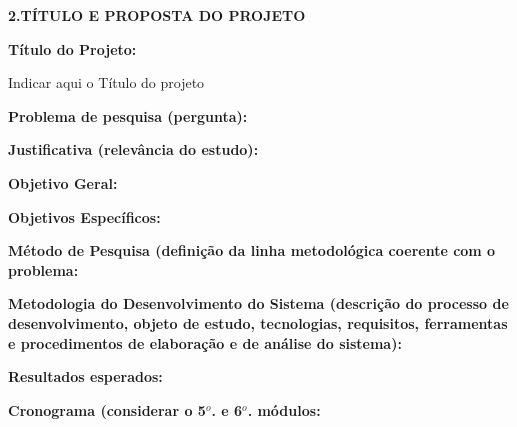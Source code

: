 \documentclass[
	hidelinks,
	12pt,				%
	openright,			%
	oneside,			%
	a4paper,			%
	english,			%
	french,				%
	spanish,			%
	brazil,				%
]{abntex2}
\begin{document}
\begin{flushleft}
   \normalsize\textbf{2.TÍTULO E PROPOSTA DO PROJETO}
\end{flushleft}

\begin{flushleft}
   \small \textbf{Título do Projeto:}
\end{flushleft} 
\normalsize
Indicar aqui o Título do projeto\\

\begin{flushleft}
\textbf{Problema de pesquisa (pergunta):}
\end{flushleft} 


\begin{flushleft}
\textbf{Justificativa (relevância do estudo):}
\end{flushleft} 


\begin{flushleft}
\textbf{Objetivo Geral:}
\end{flushleft} 



\begin{flushleft}
\textbf{Objetivos Específicos:}
\end{flushleft} 


\begin{justify}
\textbf{Método de Pesquisa (definição da linha metodológica coerente com o problema:}
\end{justify} 


\begin{justify}
\textbf{Metodologia do Desenvolvimento do Sistema (descrição do processo de desenvolvimento, objeto de estudo, tecnologias, requisitos, ferramentas e procedimentos de elaboração e de análise do sistema):}
\end{justify} 


\begin{flushleft}
\textbf{Resultados esperados:}
\end{flushleft} 


\begin{flushleft}
\textbf{Cronograma (considerar o 5$^o$. e 6$^o$. módulos:}
\end{flushleft} 




\vspace{1cm}
\end{document}
